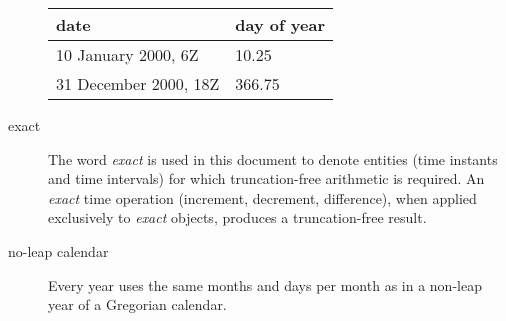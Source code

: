 \begin{description}
\begin{tabular}{ll}
{\bf date}              & {\bf day of year} \\
\hline 
10 January 2000, 6Z     & 10.25 \\
31 December 2000, 18Z   & 366.75 
\end{tabular}

\item [exact] \label{glos:exact} The word {\em exact} is used in this document
to denote entities (time instants and time intervals) for which truncation-free 
arithmetic is required. An {\em exact} time operation (increment, decrement, 
difference), when applied exclusively to {\em exact} objects, produces a
truncation-free result.

\item [no-leap calendar] \label{glos:noleap} Every year uses the same months 
and days per month as in a non-leap year of a Gregorian calendar.

\end{description}











